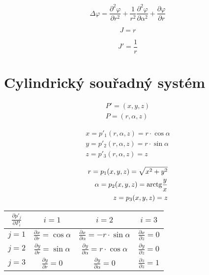 \begin{equation}
\label{eq:polarni_ss_laplace}
\Delta \varphi = \frac{\partial^2 \varphi}{\partial r^2} + \frac{1}{r^2} \frac{\partial^2 \varphi}{\partial \alpha^2} + \frac{\partial \varphi}{\partial r}
\end{equation}

\begin{equation}
\label{eq:polarni_ss_j}
J = r
\end{equation}

\begin{equation}
\label{eq:polarni_ss_j_inv}
J' = \frac{1}{r}
\end{equation}


\section{Cylindrický souřadný systém}

\begin{equation}
\begin{split}
P' = (x, y, z) \\
P = (r, \alpha, z)
\end{split}
\end{equation}

\begin{equation}
\begin{split}
x = p'_1(r, \alpha, z) = r \cdot \cos \alpha \\
y = p'_2(r, \alpha, z) = r \cdot \sin \alpha \\
z = p'_3(r, \alpha, z) = z
\end{split}
\end{equation}

\begin{equation}
\begin{split}
r = p_1(x, y, z) = \sqrt{x^2 + y^2} \\
\alpha = p_2(x, y, z) = \mathrm{arctg} \frac{y}{x} \\
z = p_3(x, y, z) = z
\end{split}
\end{equation}

\begin{tabular}{| c || c | c | c |}
\hline
\(\frac{\partial p'_j}{\partial P_i}\) & \(i=1\) & \(i=2\) & \(i=3\) \\
\hline
\hline
\(j=1\) & \(\frac{\partial x}{\partial r} = \cos \alpha\) & \(\frac{\partial x}{\partial \alpha} = -r \cdot \sin \alpha\) & \(\frac{\partial x}{\partial z} = 0\) \\
\hline
\(j=2\) & \(\frac{\partial y}{\partial r} = \sin \alpha\) & \(\frac{\partial y}{\partial \alpha} = r \cdot \cos \alpha\) & \(\frac{\partial y}{\partial z} = 0\) \\
\hline
\(j=3\) & \(\frac{\partial y}{\partial r} = 0\) & \(\frac{\partial y}{\partial \alpha} = 0\) & \(\frac{\partial z}{\partial z} = 1\) \\
\hline
\end{tabular}

